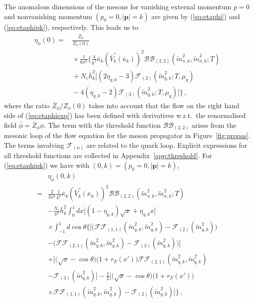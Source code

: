 \documentclass[%
reprint,
superscriptaddress,
showpacs,preprintnumbers,
 amsmath,amssymb,
 aps,
prd,
]{revtex4-1}
\def\Fig#1{Figure~\ref{#1}}
\def\eq#1{(\ref{#1})}
\def\app#1{Appendix~\ref{#1}}
\begin{document}
The anomalous dimensions of the mesons for vanishing external momentum
$p=0$ and nonvanishing momentum $(p_0=0,|\bm{p}|=k)$ are given by
\eq{eq:etaphi} and \eq{eq:etaphipk}, respectively. This leads us to
%
\begin{align}\nonumber 
  \eta_{\phi}(0) =
  &\, \frac{\bar Z_\phi}{Z_\phi(0)} \\[1ex]
  &\,\times \frac{1}{6\pi^2}\bigg
    \{\frac{4}{k^{2}}\bar{\kappa}_{k}(\bar{V}^{''}_{k}(
    \bar{\kappa}_{k}))^{2}\mathcal{BB}_{(2,2)}(\tilde{m}_{\pi,k}^{2},
    \tilde{m}_{\sigma,k}^{2};T)\nonumber \\[1ex]
  &\,+N_{c}\bar{h}_k^{2}\Big[(2\eta_{q,k}-3)\mathcal{F}_{(2)}(
    \tilde{m}_{q,k}^{2};T,\mu_q)\nonumber\\[1ex] 
  &\,-4(\eta_{q,k}-2)\mathcal{F}_{(3)}(\tilde{m}_{q,k}^{2};T,\mu_q)\Big]\bigg\}\,,
\label{eq:etaphiexp}
\end{align}
%
where the ratio $\bar Z_\phi/Z_\phi(0)$ takes into account that the
flow on the right hand side of \eq{eq:etaphiexp} has been defined with
derivatives w.r.t.\ the renormalised field $\bar\phi=\bar
Z_\phi\phi$. The term with the threshold function
$\mathcal{BB}_{(2,2)}$ arises from the mesonic loop of the flow
equation for the meson propagator in \Fig{fig:propas}. The terms
involving $\mathcal{F}_{(n)}$ are related to the quark loop. Explicit
expressions for all threshold functions are collected in
\app{app:threshold}.  For \eq{eq:etaphipk} we have with
$(0,k)= (p_0=0,|\mathbf{p}|=k)$,
%
\begin{align}
  &\eta_{\phi}(0,k)\nonumber \\[1ex]
  =&\frac{2}{3\pi^2}\frac{1}{k^{2}}\bar{\kappa}_{k}(\bar{V}^{''}_{k}(
     \bar{\kappa}_{k}))^{2}\mathcal{BB}_{(2,2)}(\tilde{m}_{\pi,k}^{2},
     \tilde{m}_{\sigma,k}^{2};T)\nonumber \\[1ex]
  &-\frac{N_{c}}{\pi^2}\bar h_k^2\int_0^1 d x\bigg[(1-\eta_{q,k}) \sqrt x
    +\eta_{q,k} x\bigg]\nonumber\\[1ex]
  &\times \int_{-1}^1 d \cos \theta\Bigg\{\bigg[
    \Big(\mathcal{FF}_{(1,1)}(\tilde{m}_{q,k}^{2},
    \tilde{m}_{q,k}^{2})-\mathcal{F}_{(2)}(
    \tilde{m}_{q,k}^{2}) \Big)\nonumber \\[1ex]
  &-\Big(\mathcal{FF}_{(2,1)}(\tilde{m}_{q,k}^{2},
    \tilde{m}_{q,k}^{2})-\mathcal{F}_{(3)}(\tilde{m}_{q,k}^{2})
    \Big)\bigg] \nonumber \\[1ex]
  &+\bigg[\Big(\sqrt x -\cos \theta\Big)
    \Big(1+r_F(x')\Big)\mathcal{FF}_{(2,1)}(
    \tilde{m}_{q,k}^{2},\tilde{m}_{q,k}^{2})\nonumber \\[1ex]
  &-\mathcal{F}_{(3)}(\tilde{m}_{q,k}^{2})\bigg]
    -\frac{1}{2}\bigg[\Big(\sqrt x -\cos \theta\Big)
    \Big(1+r_F(x')\Big)\nonumber \\[1ex]
  &\times\mathcal{FF}_{(1,1)}(\tilde{m}_{q,k}^{2},
    \tilde{m}_{q,k}^{2})-\mathcal{F}_{(2)}(
    \tilde{m}_{q,k}^{2})\bigg]\Bigg\}\,,
\label{eq:etaphipkexp}
\end{align}
\end{document}
